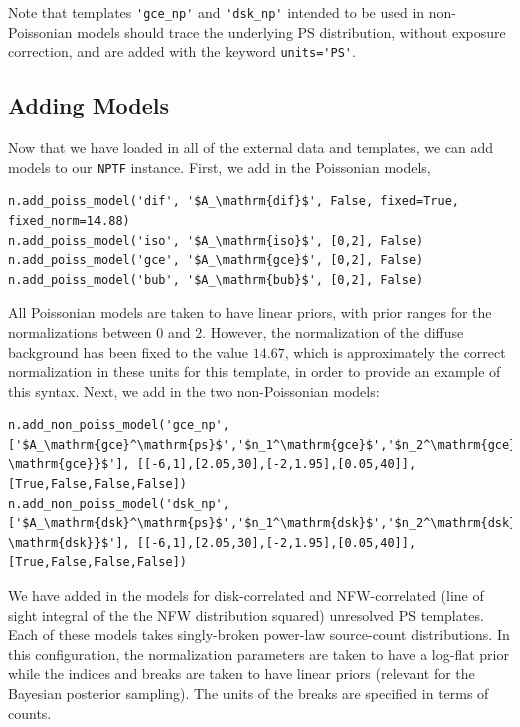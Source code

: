 Note that templates \lstinline{'gce_np'} and \lstinline{'dsk_np'} intended to be used in non-Poissonian models should trace the underlying PS distribution, without exposure correction, and are added with the keyword \lstinline{units='PS'}.

\subsection{Adding Models}
Now that we have loaded in all of the external data and templates, we can add models to our \lstinline{NPTF} instance.  First, we add in the Poissonian models,
\begin{lstlisting}
n.add_poiss_model('dif', '$A_\mathrm{dif}$', False, fixed=True, fixed_norm=14.88)
n.add_poiss_model('iso', '$A_\mathrm{iso}$', [0,2], False)
n.add_poiss_model('gce', '$A_\mathrm{gce}$', [0,2], False)
n.add_poiss_model('bub', '$A_\mathrm{bub}$', [0,2], False)
\end{lstlisting}
All Poissonian models are taken to have linear priors, with prior ranges for the normalizations between 0 and 2.  However, the normalization of the diffuse background has been fixed to the value $14.67$, which is approximately the correct normalization in these units for this template, in order to provide an example of this syntax.  Next, we add in the two non-Poissonian models:
\begin{lstlisting}
n.add_non_poiss_model('gce_np', ['$A_\mathrm{gce}^\mathrm{ps}$','$n_1^\mathrm{gce}$','$n_2^\mathrm{gce}$','$S_b^{(1), \mathrm{gce}}$'], [[-6,1],[2.05,30],[-2,1.95],[0.05,40]], [True,False,False,False])
n.add_non_poiss_model('dsk_np', ['$A_\mathrm{dsk}^\mathrm{ps}$','$n_1^\mathrm{dsk}$','$n_2^\mathrm{dsk}$','$S_b^{(1), \mathrm{dsk}}$'], [[-6,1],[2.05,30],[-2,1.95],[0.05,40]], [True,False,False,False])
\end{lstlisting}
We have added in the models for disk-correlated and NFW-correlated (line of sight integral of the the NFW distribution squared) unresolved PS templates.  Each of these models takes singly-broken power-law source-count distributions.  In this configuration, the normalization parameters are taken to have a log-flat prior while the indices and breaks are taken to have linear priors (relevant for the Bayesian posterior sampling).  The units of the breaks are specified in terms of counts. 

